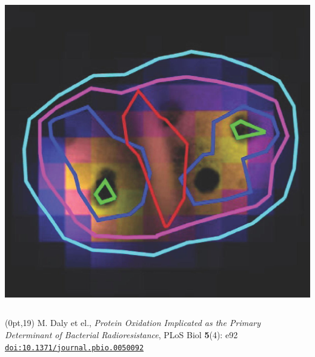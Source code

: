 \begin{frame}
\begin{columns}
\begin{column}{0.5\linewidth}
      \includegraphics[width=\linewidth]{xrf/dr_superposed.jpg}
    \end{column}
  \end{columns}    
  
  \bigskip

  \begin{textblock*}{0.5\linewidth}(0pt,19\TPVertModule)
    \tiny M. Daly et el., \textit{Protein Oxidation Implicated as the
      Primary Determinant of Bacterial Radioresistance}, PLoS
    Biol \textbf{5}(4): e92
    \href{http://dx.doi.org/10.1371/journal.pbio.0050092}
    {\color{Blue4}\texttt{doi:10.1371/journal.pbio.0050092}}
  \end{textblock*}
\end{frame}

